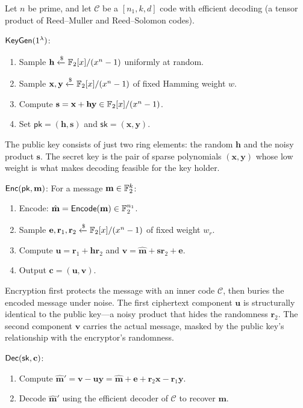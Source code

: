 \begin{definition}
\label{def:hqc-pke}
Let $n$ be prime, and let $\mathcal{C}$ be a $[n_1, k, d]$ code with efficient decoding (a tensor product of Reed--Muller and Reed--Solomon codes).

\medskip
\noindent$\mathsf{KeyGen}(1^\lambda)$:
\begin{enumerate}
\item Sample $\mathbf{h} \getsr \F_2[x]/(x^n - 1)$ uniformly at random.
\item Sample $\mathbf{x}, \mathbf{y} \getsr \F_2[x]/(x^n - 1)$ of fixed Hamming weight $w$.
\item Compute $\mathbf{s} = \mathbf{x} + \mathbf{h}\mathbf{y} \in \mathbb{F}_2[x]/(x^n - 1)$.
\item Set $\mathsf{pk} = (\mathbf{h}, \mathbf{s})$ and $\mathsf{sk} = (\mathbf{x}, \mathbf{y})$.
\end{enumerate}

The public key consists of just two ring elements: the random $\mathbf{h}$ and the noisy product $\mathbf{s}$.  The secret key is the pair of sparse polynomials $(\mathbf{x}, \mathbf{y})$ whose low weight is what makes decoding feasible for the key holder.

\medskip
\noindent$\mathsf{Enc}(\mathsf{pk}, \mathbf{m})$: For a message $\mathbf{m} \in \mathbb{F}_2^k$:
\begin{enumerate}
\item Encode: $\hat{\mathbf{m}} = \mathsf{Encode}(\mathbf{m}) \in \mathbb{F}_2^{n_1}$.
\item Sample $\mathbf{e}, \mathbf{r}_1, \mathbf{r}_2 \getsr \F_2[x]/(x^n - 1)$ of fixed weight $w_r$.
\item Compute $\mathbf{u} = \mathbf{r}_1 + \mathbf{h}\mathbf{r}_2$ and $\mathbf{v} = \hat{\mathbf{m}} + \mathbf{s}\mathbf{r}_2 + \mathbf{e}$.
\item Output $\mathbf{c} = (\mathbf{u}, \mathbf{v})$.
\end{enumerate}

Encryption first protects the message with an inner code $\mathcal{C}$, then buries the encoded message under noise.  The first ciphertext component $\mathbf{u}$ is structurally identical to the public key---a noisy product that hides the randomness $\mathbf{r}_2$.  The second component $\mathbf{v}$ carries the actual message, masked by the public key's relationship with the encryptor's randomness.

\medskip
\noindent$\mathsf{Dec}(\mathsf{sk}, \mathbf{c})$:
\begin{enumerate}
\item Compute $\hat{\mathbf{m}}' = \mathbf{v} - \mathbf{u}\mathbf{y} = \hat{\mathbf{m}} + \mathbf{e} + \mathbf{r}_2\mathbf{x} - \mathbf{r}_1\mathbf{y}$.
\item Decode $\hat{\mathbf{m}}'$ using the efficient decoder of $\mathcal{C}$ to recover $\mathbf{m}$.
\end{enumerate}


\end{definition}
